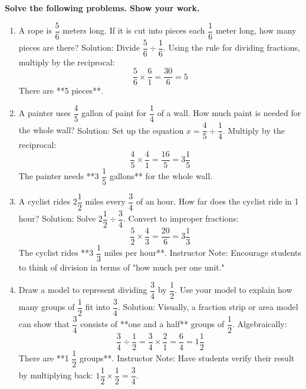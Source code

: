 \documentclass[12pt]{article}
\begin{document}
\begin{tcolorbox}[colframe=black!60, colback=white, 
coltitle=black, colbacktitle=black!15, fonttitle=\bfseries\Large, 
title=Problems, halign title=center, left=5pt, right=10pt, top=10pt, bottom=10pt]
\textbf{Solve the following problems. Show your work.}

\begin{enumerate}[start=9, itemsep=.5em]
    \item \small A rope is \( \dfrac{5}{6} \) meters long. If it is cut into pieces each \( \dfrac{1}{6} \) meter long, how many pieces are there?  
        {\small \color{red} Solution: Divide \( \dfrac{5}{6} \div \dfrac{1}{6} \). Using the rule for dividing fractions, multiply by the reciprocal:  
        \[
        \dfrac{5}{6} \times \dfrac{6}{1} = \dfrac{30}{6} = 5
        \]
        There are **5 pieces**.}  
      

    \item \small A painter uses \( \dfrac{4}{5} \) gallon of paint for \( \dfrac{1}{4} \) of a wall. How much paint is needed for the whole wall?  
        {\color{red} Solution: Set up the equation \( x = \dfrac{4}{5} \div \dfrac{1}{4} \). Multiply by the reciprocal:  
        \[
        \dfrac{4}{5} \times \dfrac{4}{1} = \dfrac{16}{5} = 3 \dfrac{1}{5}
        \]
        The painter needs **3 \(\dfrac{1}{5}\) gallons** for the whole wall.}  
       

    \item \small A cyclist rides \( 2 \dfrac{1}{2} \) miles every \( \dfrac{3}{4} \) of an hour. How far does the cyclist ride in 1 hour?  
        {\color{red} Solution: Solve \( 2 \dfrac{1}{2} \div \dfrac{3}{4} \). Convert to improper fractions:  
        \[
        \dfrac{5}{2} \times \dfrac{4}{3} = \dfrac{20}{6} = 3 \dfrac{1}{3}
        \]
        The cyclist rides **3 \(\dfrac{1}{3}\) miles per hour**.}  
        {\color{blue} Instructor Note: Encourage students to think of division in terms of "how much per one unit."}

    \item \small Draw a model to represent dividing \( \dfrac{3}{4} \) by \( \dfrac{1}{2} \). Use your model to explain how many groups of \( \dfrac{1}{2} \) fit into \( \dfrac{3}{4} \).  
        {\color{red} Solution: Visually, a fraction strip or area model can show that \( \dfrac{3}{4} \) consists of **one and a half** groups of \( \dfrac{1}{2} \). Algebraically:  
        \[
        \dfrac{3}{4} \div \dfrac{1}{2} = \dfrac{3}{4} \times \dfrac{2}{1} = \dfrac{6}{4} = 1 \dfrac{1}{2}
        \]
        There are **1 \(\dfrac{1}{2}\) groups**.}  
        {\color{blue} Instructor Note: Have students verify their result by multiplying back: \( 1 \dfrac{1}{2} \times \dfrac{1}{2} = \dfrac{3}{4} \).}

\end{enumerate}
        \end{tcolorbox}
\end{document}
